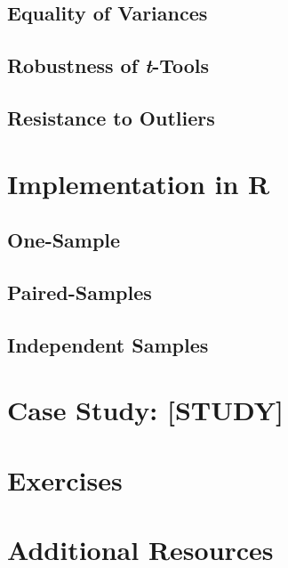 \subsection{Equality of Variances}

\subsection{Robustness of \textit{t}-Tools}

\subsection{Resistance to Outliers}

\section{Implementation in R}

\subsection{One-Sample}

\subsection{Paired-Samples}

\subsection{Independent Samples}

\section{Case Study: [STUDY]}

\section{Exercises}

\section{Additional Resources}
